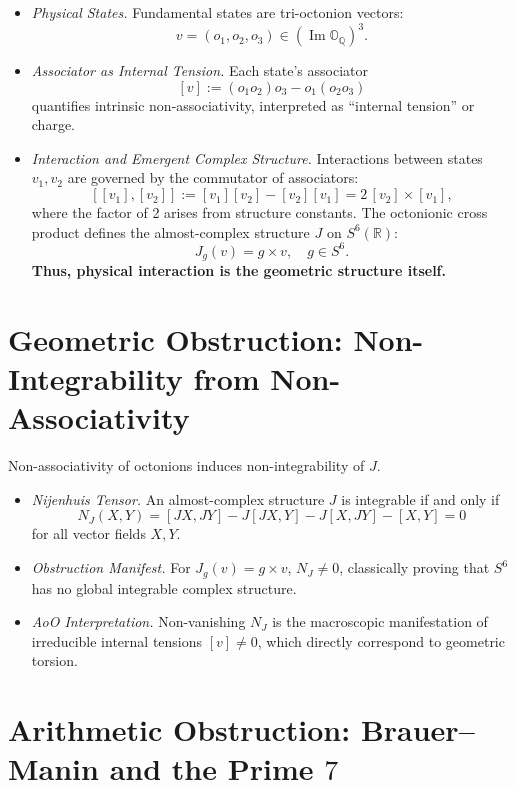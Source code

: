 \documentclass[12pt]{article}
\begin{document}
\begin{itemize}
    \item \emph{Physical States.} Fundamental states are tri-octonion vectors:
    \[
    v = (o_1, o_2, o_3) \in (\operatorname{Im}\mathbb{O}_{\mathbb{Q}})^3.
    \]
    \item \emph{Associator as Internal Tension.} Each state's associator
    \[
    [v] := (o_1 o_2) o_3 - o_1 (o_2 o_3)
    \]
    quantifies intrinsic non-associativity, interpreted as “internal tension” or charge.
    \item \emph{Interaction and Emergent Complex Structure.} Interactions between states \(v_1, v_2\) are governed by the commutator of associators:
    \[
    [[v_1],[v_2]] := [v_1][v_2] - [v_2][v_1] = 2\, [v_2] \times [v_1],
    \]
    where the factor of 2 arises from structure constants. The octonionic cross product defines the almost-complex structure \(J\) on \(S^6(\mathbb{R})\):
    \[
    J_g(v) = g \times v, \quad g \in S^6.
    \]
    \textbf{Thus, physical interaction is the geometric structure itself.}
\end{itemize}

\section{Geometric Obstruction: Non-Integrability from Non-Associativity}

Non-associativity of octonions induces non-integrability of \(J\).

\begin{itemize}
    \item \emph{Nijenhuis Tensor.} An almost-complex structure \(J\) is integrable if and only if
    \[
    N_J(X,Y) = [JX, JY] - J[JX,Y] - J[X,JY] - [X,Y] = 0
    \]
    for all vector fields \(X,Y\).
    \item \emph{Obstruction Manifest.} For \(J_g(v) = g \times v\), \(N_J \neq 0\), classically proving that \(S^6\) has no global integrable complex structure.
    \item \emph{AoO Interpretation.} Non-vanishing \(N_J\) is the macroscopic manifestation of irreducible internal tensions \([v] \neq 0\), which directly correspond to geometric torsion.
\end{itemize}

\section{Arithmetic Obstruction: Brauer–Manin and the Prime \(7\)}
\end{document}

